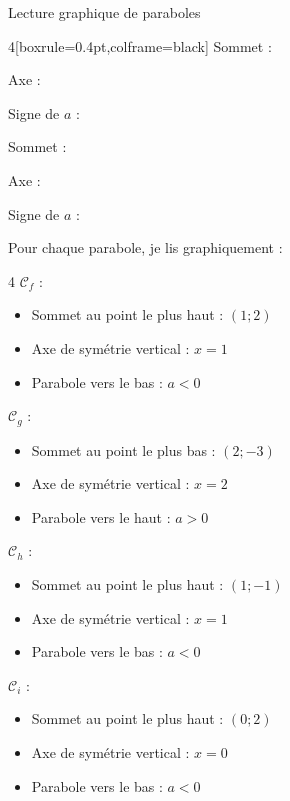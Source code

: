 \begin{EXO}{Lecture graphique de paraboles}{}
\begin{MultiColonnes}{4}[boxrule=0.4pt,colframe=black]
Sommet : 

Axe : 
  
Signe de $a$ : 


\tcbitem[halign=center]

Sommet : 

Axe : 
  
Signe de $a$ : 

\end{MultiColonnes}

\exocorrection

Pour chaque parabole, je lis graphiquement :

\begin{MultiColonnes}{4}
\tcbitem[halign=center] $\mathcal{C}_f$ : 
\begin{itemize}
\item Sommet au point le plus haut : $(1;2)$
\item Axe de symétrie vertical : $x=1$ 
\item Parabole vers le bas : $a<0$
\end{itemize}

\tcbitem[halign=center] $\mathcal{C}_g$ :
\begin{itemize}
\item Sommet au point le plus bas : $(2;-3)$
\item Axe de symétrie vertical : $x=2$
\item Parabole vers le haut : $a>0$
\end{itemize}

\tcbitem[halign=center] $\mathcal{C}_h$ :
\begin{itemize}
\item Sommet au point le plus haut : $(1;-1)$
\item Axe de symétrie vertical : $x=1$
\item Parabole vers le bas : $a<0$
\end{itemize}

\tcbitem[halign=center] $\mathcal{C}_i$ :
\begin{itemize}
\item Sommet au point le plus haut : $(0;2)$
\item Axe de symétrie vertical : $x=0$
\item Parabole vers le bas : $a<0$
\end{itemize}
\end{MultiColonnes}
\end{EXO}